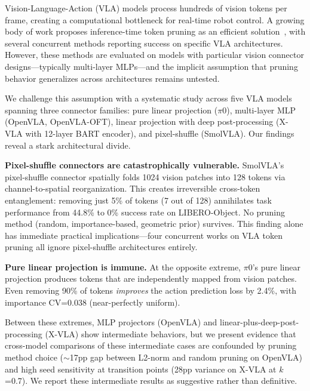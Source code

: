 \documentclass[letterpaper]{article}
\begin{document}
Vision-Language-Action (VLA) models process hundreds of vision tokens per frame, creating a computational bottleneck for real-time robot control.
A growing body of work proposes inference-time token pruning as an efficient solution~\cite{chen2024image,liang2022not}, with several concurrent methods reporting success on specific VLA architectures.
However, these methods are evaluated on models with particular vision connector designs---typically multi-layer MLPs---and the implicit assumption that pruning behavior generalizes across architectures remains untested.

We challenge this assumption with a systematic study across five VLA models spanning three connector families: pure linear projection ($\pi$0), multi-layer MLP (OpenVLA, OpenVLA-OFT), linear projection with deep post-processing (X-VLA with 12-layer BART encoder), and pixel-shuffle (SmolVLA).
Our findings reveal a stark architectural divide.

\textbf{Pixel-shuffle connectors are catastrophically vulnerable.}
SmolVLA's pixel-shuffle connector spatially folds 1024 vision patches into 128 tokens via channel-to-spatial reorganization.
This creates irreversible cross-token entanglement: removing just 5\% of tokens (7 out of 128) annihilates task performance from 44.8\% to 0\% success rate on LIBERO-Object.
No pruning method (random, importance-based, geometric prior) survives.
This finding alone has immediate practical implications---four concurrent works on VLA token pruning all ignore pixel-shuffle architectures entirely.

\textbf{Pure linear projection is immune.}
At the opposite extreme, $\pi$0's pure linear projection produces tokens that are independently mapped from vision patches.
Even removing 90\% of tokens \emph{improves} the action prediction loss by 2.4\%, with importance CV=0.038 (near-perfectly uniform).

Between these extremes, MLP projectors (OpenVLA) and linear-plus-deep-post-processing (X-VLA) show intermediate behaviors, but we present evidence that cross-model comparisons of these intermediate cases are confounded by pruning method choice ($\sim$17pp gap between L2-norm and random pruning on OpenVLA) and high seed sensitivity at transition points (28pp variance on X-VLA at $k$=0.7).
We report these intermediate results as suggestive rather than definitive.
\end{document}
